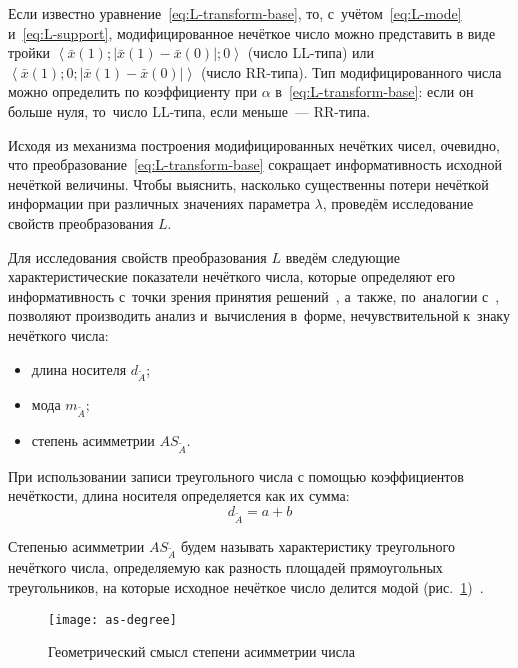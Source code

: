 Если известно уравнение~\eqref{eq:L-transform-base}, то, с~учётом~\eqref{eq:L-mode} и~\eqref{eq:L-support}, модифицированное нечёткое число можно представить в виде тройки $\displaystyle \left\langle \bar{x}\left( 1 \right);\left| \bar{x}\left( 1 \right)-\bar{x}\left( 0 \right) \right|;0 \right\rangle$ (число LL-типа) или $\displaystyle \left\langle \bar{x}\left( 1 \right);0;\left| \bar{x}\left( 1 \right)-\bar{x}\left( 0 \right) \right| \right\rangle$ (число RR-типа). Тип модифицированного числа можно определить по коэффициенту при $\alpha$ в~\eqref{eq:L-transform-base}: если он больше нуля, то~число LL-типа, если меньше~--- RR-типа.

Исходя из механизма построения модифицированных нечётких чисел, очевидно, что преобразование~\eqref{eq:L-transform-base} сокращает информативность исходной нечёткой величины. Чтобы выяснить, насколько существенны потери нечёткой информации при различных значениях параметра $\lambda$, проведём исследование свойств преобразования $L$.

Для исследования свойств преобразования $L$ введём следующие характеристические показатели нечёткого числа, которые определяют его информативность с~точки зрения принятия решений~\cite{VSU-1, Alushta-1}, а~также, по~аналогии с~\cite{Spesivtsev}, позволяют производить анализ и~вычисления в~форме, нечувствительной к~знаку нечёткого числа:
\begin{itemize}
  \item длина носителя $d_{\tilde A}$;
  \item мода $m_{\tilde A}$;
  \item степень асимметрии $AS_{\tilde A}$.
\end{itemize}

При использовании записи треугольного числа с помощью коэффициентов нечёткости, длина носителя определяется как их сумма:
\begin{equation}
\label{eq:support-length}
  d_{\tilde A}=a+b
\end{equation}

\begin{mydef}
  Степенью асимметрии $AS_{\tilde A}$ будем называть характеристику треугольного нечёткого числа, определяемую как разность площадей прямоугольных треугольников, на которые исходное нечёткое число делится модой (рис.~\ref{fig:as-degree})~\cite{VSU-1}.
\end{mydef}
\begin{figure}[h!]
  \centering
  {
    \texttt{[image: as-degree]}
    \caption{Геометрический смысл степени асимметрии числа}
    \label{fig:as-degree}
  }
\end{figure}

